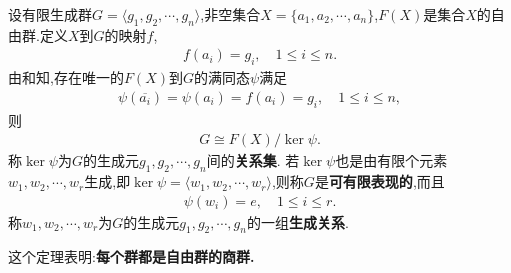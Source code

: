 \documentclass[../../main.tex]{subfiles}%
\begin{document}
\begin{theorem}\label{theorem:抽象代数--推论4.8.2}
设有限生成群$G=\langle g_1,g_2,\cdots,g_n\rangle$,非空集合$X=\{a_1,a_2,\cdots,a_n\}$,$F(X)$是集合$X$的自由群.定义$X$到$G$的映射$f$,
\begin{align*}
f(a_i)=g_i,\quad 1\leqslant i\leqslant n.
\end{align*}
由和知,存在唯一的$F(X)$到$G$的满同态$\psi$满足
\begin{align*}
\psi(\overline{a_i})=\psi(a_i)=f(a_i)=g_i,\quad 1\leqslant i\leqslant n,
\end{align*}
则
\begin{align*}
G\cong F(X)/\ker \psi.
\end{align*}
称$\ker\psi$为$G$的生成元$g_1,g_2,\cdots,g_n$间的\textbf{关系集}. 若$\ker\psi$也是由有限个元素$w_1,w_2,\cdots,w_r$生成,即$\ker\psi = \langle w_1,w_2,\cdots, w_r\rangle$,则称$G$是\textbf{可有限表现的},而且
\begin{align*}
\psi(w_i)=e,\quad 1\leqslant i\leqslant r.
\end{align*}
称$w_1,w_2,\cdots,w_r$为$G$的生成元$g_1,g_2,\cdots,g_n$的一组\textbf{生成关系}.
\end{theorem}
\begin{remark}
这个定理表明:\textbf{每个群都是自由群的商群.}
\end{remark}
\end{document}
